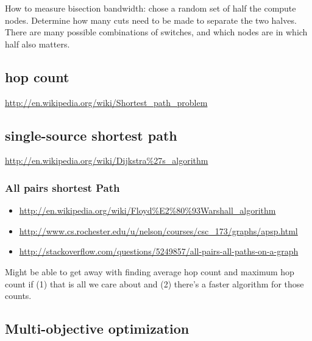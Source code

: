 \documentclass[pdftex]{article}
\begin{document}
How to measure bisection bandwidth: chose a random set of half the compute nodes. Determine how many cuts need to be made to separate the two halves. There are many possible combinations of switches, and which nodes are in which half also matters.


\subsection{hop count}

\href{http://en.wikipedia.org/wiki/Shortest_path_problem}{http://en.wikipedia.org/wiki/Shortest\_path\_problem}

\subsection{single-source shortest path}

\href{http://en.wikipedia.org/wiki/Dijkstra\%27s_algorithm}{http://en.wikipedia.org/wiki/Dijkstra\%27s\_algorithm}

\subsubsection{All pairs shortest Path}

\begin{itemize}
 \item \href{http://en.wikipedia.org/wiki/Floyd\%E2\%80\%93Warshall_algorithm}{http://en.wikipedia.org/wiki/Floyd\%E2\%80\%93Warshall\_algorithm}
 \item \href{http://www.cs.rochester.edu/u/nelson/courses/csc_173/graphs/apsp.html}{http://www.cs.rochester.edu/u/nelson/courses/csc\_173/graphs/apsp.html}
 \item \href{http://stackoverflow.com/questions/5249857/all-pairs-all-paths-on-a-graph}{http://stackoverflow.com/questions/5249857/all-pairs-all-paths-on-a-graph}
\end{itemize}
Might be able to get away with finding average hop count and maximum hop count if (1) that is all we care about and (2) there's a faster algorithm for those counts.


\subsection{Multi-objective optimization}
 
\end{document}
